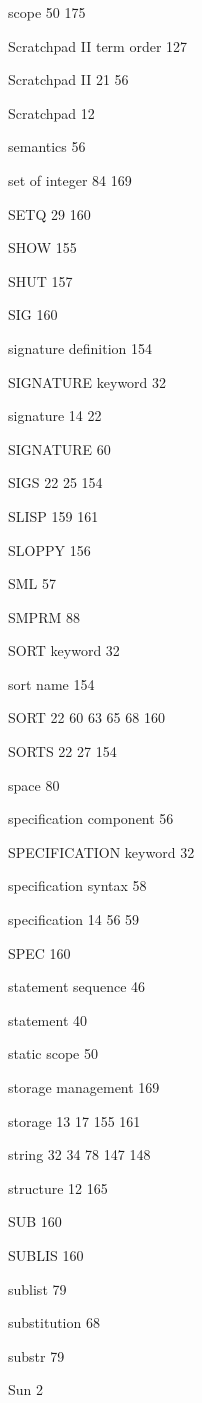 \item scope  50 175
\item Scratchpad II term order 127
\item Scratchpad II  21 56
\item Scratchpad 12
\item semantics 56
\item set of integer  84 169
\item SETQ  29 160
\item SHOW 155
\item SHUT 157
\item SIG 160
\item signature definition  154
\item SIGNATURE keyword 32
\item signature  14 22
\item SIGNATURE 60
\item SIGS  22 25 154
\item SLISP  159 161
\item SLOPPY 156
\item SML 57
\item SMPRM 88
\item SORT keyword 32
\item sort name 154
\item SORT  22 60 63 65 68 160
\item SORTS  22 27 154
\item space 80
\item specification component 56
\item SPECIFICATION keyword 32
\item specification syntax 58
\item specification  14 56 59
\item SPEC 160
\item statement sequence 46
\item statement 40
\item static scope 50
\item storage management 169
\item storage  13 17 155 161
\item string  32 34 78  147 148
\item structure  12 165
\item SUB 160
\item SUBLIS 160
\item sublist 79
\item substitution 68
\item substr 79
\item Sun 2
